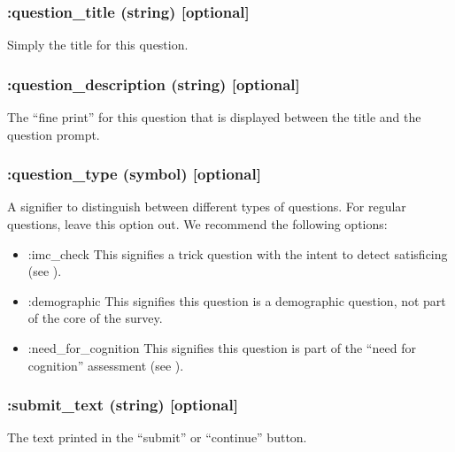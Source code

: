 \documentclass[12pt]{article}
\begin{document}
\subsubsection{:question\_title (string) [optional]}

Simply the title for this question.

\subsubsection{:question\_description (string) [optional]}

The ``fine print'' for this question that is displayed between the title and the question prompt.

\subsubsection{:question\_type (symbol) [optional]}

A signifier to distinguish between different types of questions. For regular questions, leave this option out. We recommend the following options:

\begin{itemize}
\item :imc\_check \quad This signifies a trick question with the intent to detect satisficing (see \citet{Opp09}).
\item :demographic \quad This signifies this question is a demographic question, not part of the core of the survey.
\item :need\_for\_cognition \quad This signifies this question is part of the ``need for cognition'' assessment (see \citet{Cacioppo1984}).
\end{itemize}

\subsubsection{:submit\_text (string) [optional]}

The text printed in the ``submit'' or ``continue'' button.

%

\end{document}
